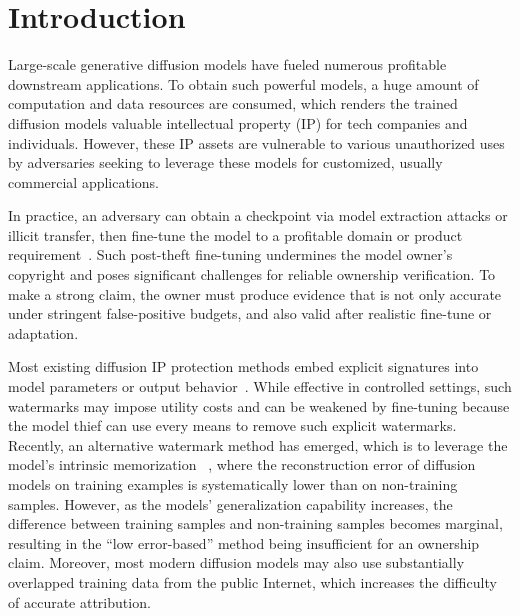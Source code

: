 \documentclass{article}
\begin{document}
\section{Introduction}
\label{sec:intro}
Large-scale generative diffusion models have fueled numerous profitable downstream applications.
To obtain such powerful models, a huge amount of computation and data resources are consumed, which renders the trained diffusion models valuable intellectual property (IP) for tech companies and individuals. 
However, these IP assets are vulnerable to various unauthorized uses by adversaries seeking to leverage these models for customized, usually commercial applications.

In practice, an adversary can obtain a checkpoint via model extraction attacks or illicit transfer, then fine-tune the model to a profitable domain or product requirement~\cite{wang2025sleepermark,kim2024wouaf}. 
Such post-theft fine-tuning undermines the model owner’s copyright and poses significant challenges for reliable ownership verification.
To make a strong claim, the owner must produce evidence that is not only accurate under stringent false-positive budgets, 
and also valid after realistic fine-tune or adaptation.

Most existing diffusion IP protection methods embed explicit signatures into model parameters or output behavior~\citep{peng2023watermark,zhao2023recipe,fernandez2023stable,liu2023watermarking}. 
While effective in controlled settings, such watermarks may impose utility costs and can be weakened by fine-tuning because the model thief can use every means to remove such explicit watermarks.
Recently, an alternative watermark method has emerged, which is to leverage the model's intrinsic memorization~\citep{carlini2023extracting,somepalli2023diffusion,gu2025on} , where the reconstruction error of diffusion models on training examples is systematically lower than on non-training samples.
However, as the models' generalization capability increases, the difference between training samples and non-training samples becomes marginal, resulting in the ``low error-based'' method being insufficient for an ownership claim.
Moreover, most modern diffusion models may also use substantially overlapped training data from the public Internet, which increases the difficulty of accurate attribution. 
\end{document}
